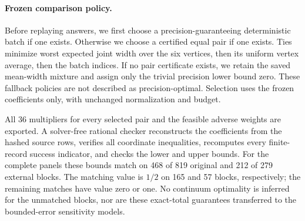 \paragraph{Frozen comparison policy.}
Before replaying answers, we first choose a precision-guaranteeing
deterministic batch if one exists.  Otherwise we choose a certified equal
pair if one exists.  Ties minimize worst expected joint width over the six
vertices, then its uniform vertex average, then the batch indices.  If no
pair certificate exists, we retain the saved mean-width mixture and assign
only the trivial precision lower bound zero.  These fallback policies are
not described as precision-optimal.  Selection uses the frozen coefficients
only, with unchanged normalization and budget.

All 36 multipliers for every selected pair and the feasible adverse
weights are exported.  A solver-free rational checker reconstructs the
coefficients from the hashed source rows, verifies all coordinate
inequalities, recomputes every finite-record success indicator, and checks
the lower and upper bounds.  For the complete panels these bounds match
on 468 of 819 original and 212 of 279 external blocks.  The matching value
is $1/2$ on 165 and 57 blocks, respectively; the remaining matches have
value zero or one.  No continuum optimality is inferred for the unmatched
blocks, nor are these exact-total guarantees transferred to the
bounded-error sensitivity models.
